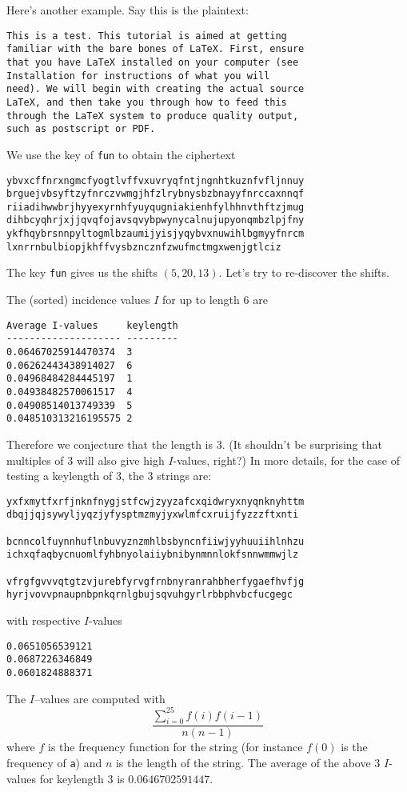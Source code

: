 Here's another example. 
Say this is the plaintext:
\begin{Verbatim}[frame=single]
This is a test. This tutorial is aimed at getting 
familiar with the bare bones of LaTeX. First, ensure
that you have LaTeX installed on your computer (see
Installation for instructions of what you will 
need). We will begin with creating the actual source 
LaTeX, and then take you through how to feed this 
through the LaTeX system to produce quality output, 
such as postscript or PDF.
\end{Verbatim}
We use the key of \verb!fun! to obtain the ciphertext
\begin{Verbatim}[frame=single]
ybvxcffnrxngmcfyogtlvffvxuvryqfntjngnhtkuznfvfljnnuy
brguejvbsyftzyfnrczvwmgjhfzlrybnysbzbnayyfnrccaxnnqf
riiadihwwbrjhyyexyrnhfyuyqugniakienhfylhhnvthftzjmug
dihbcyqhrjxjjqvqfojavsqvybpwynycalnujupyonqmbzlpjfny
ykfhqybrsnnpyltogmlbzaumijyisjyqybvxnuwihlbgmyyfnrcm
lxnrrnbulbiopjkhffvysbzncznfzwufmctmgxwenjgtlciz
\end{Verbatim}
The key \verb!fun! gives us the shifts $(5, 20, 13)$.
Let's try to re-discover the shifts.

The (sorted) incidence values $I$ for up to length 6 are
\begin{Verbatim}[frame=single]
Average I-values     keylength
-------------------- ---------
0.06467025914470374  3
0.06262443438914027  6
0.04968484284445197  1
0.04938482570061517  4
0.04908514013749339  5
0.048510313216195575 2
\end{Verbatim}
Therefore we conjecture that the length is 3.
(It shouldn't be surprising that multiples of 3 will
also give high $I$-values, right?)
In more details, for the case of testing a keylength of 3,
the 3 strings are:
\begin{Verbatim}[frame=single]
yxfxmytfxrfjnknfnygjstfcwjzyyzafcxqidwryxnyqnknyhttm
dbqjjqjsywyljyqzjyfysptmzmyjyxwlmfcxruijfyzzzftxnti

bcnncolfuynnhuflnbuvyznzmhlbsbyncnfiiwjyyhuuiihlnhzu
ichxqfaqbycnuomlfyhbnyolaiiybnibynmnnlokfsnnwmmwjlz

vfrgfgvvvqtgtzvjurebfyrvgfrnbnyranrahbherfygaefhvfjg
hyrjvovvpnaupnbpnkqrnlgbujsqvuhgyrlrbbphvbcfucgegc
\end{Verbatim} 
with respective $I$-values 
\begin{Verbatim}[frame=single]
0.0651056539121
0.0687226346849
0.0601824888371
\end{Verbatim}
The $I$--values are computed with
\[
\frac{\sum_{i=0}^{25} f(i)f(i-1)}{n(n-1)}
\]
where $f$ is the frequency function for the string
(for instance $f(0)$ is the frequency of \verb!a!) 
and $n$ is the length of the string.
The average of the above 3 $I$-values for keylength 3 is
$0.0646702591447$.

